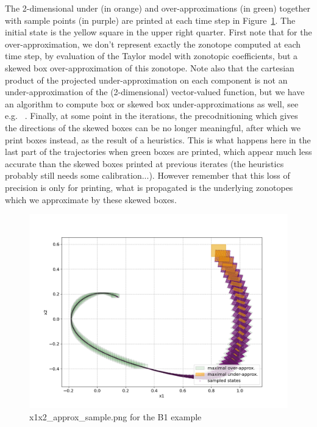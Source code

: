 \documentclass{article}
\begin{document}
The 2-dimensional under (in orange) and over-approximations (in green) together with sample points (in purple) are printed at each time step in Figure~\ref{fig:Proj_sample_B1}. The initial state is the yellow square in the upper right quarter. First note that for the over-approximation, we don't represent exactly the zonotope  computed at each time step, by evaluation of the Taylor model with zonotopic coefficients, but a skewed box over-approximation of this zonotope.  Note also that the cartesian product of the projected under-approximation on each component is not an under-approximation of the (2-dimensional) vector-valued function, but we have an algorithm to compute box or skewed box under-approximations as well, see e.g. ~\cite{lcss2020,adhs21}. Finally, at some point in the iterations, the precodnitioning which gives the directions of the skewed boxes can be no longer meaningful, after which we print boxes instead, as the result of a heuristics.  This is what happens here in the last part of the trajectories when green boxes are printed, which appear much less accurate than the skewed boxes printed at previous iterates (the heuristics probably still needs some calibration...). However remember that this loss of precision is only for printing, what is propagated is the underlying zonotopes which we approximate by these skewed boxes.  
\begin{figure}[htbp]
\centering
  \includegraphics[width=.99\linewidth]{x1x2_approx_sample_B1sig.png}
\caption{ x1x2\_approx\_sample.png for the B1 example}
\label{fig:Proj_sample_B1}
\end{figure}
\end{document}
